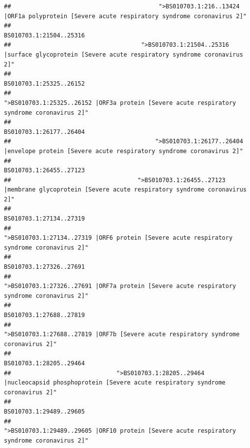 \documentclass[
]{article}
\begin{document}
\begin{verbatim}
##                                          ">BS010703.1:216..13424 |ORF1a polyprotein [Severe acute respiratory syndrome coronavirus 2]" 
##                                                                                                                BS010703.1:21504..25316 
##                                     ">BS010703.1:21504..25316 |surface glycoprotein [Severe acute respiratory syndrome coronavirus 2]" 
##                                                                                                                BS010703.1:25325..26152 
##                                            ">BS010703.1:25325..26152 |ORF3a protein [Severe acute respiratory syndrome coronavirus 2]" 
##                                                                                                                BS010703.1:26177..26404 
##                                         ">BS010703.1:26177..26404 |envelope protein [Severe acute respiratory syndrome coronavirus 2]" 
##                                                                                                                BS010703.1:26455..27123 
##                                    ">BS010703.1:26455..27123 |membrane glycoprotein [Severe acute respiratory syndrome coronavirus 2]" 
##                                                                                                                BS010703.1:27134..27319 
##                                             ">BS010703.1:27134..27319 |ORF6 protein [Severe acute respiratory syndrome coronavirus 2]" 
##                                                                                                                BS010703.1:27326..27691 
##                                            ">BS010703.1:27326..27691 |ORF7a protein [Severe acute respiratory syndrome coronavirus 2]" 
##                                                                                                                BS010703.1:27688..27819 
##                                                    ">BS010703.1:27688..27819 |ORF7b [Severe acute respiratory syndrome coronavirus 2]" 
##                                                                                                                BS010703.1:28205..29464 
##                              ">BS010703.1:28205..29464 |nucleocapsid phosphoprotein [Severe acute respiratory syndrome coronavirus 2]" 
##                                                                                                                BS010703.1:29489..29605 
##                                            ">BS010703.1:29489..29605 |ORF10 protein [Severe acute respiratory syndrome coronavirus 2]" 

\end{verbatim}
\end{document}

